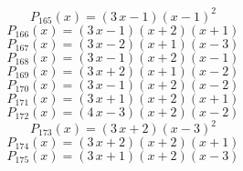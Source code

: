 \subitem \begin{dmath*}P_{165}(x) = {\left(3 \, x - 1\right)} {\left(x - 1\right)}^{2} \end{dmath*}\vspace{-1.2cm}
\subitem \begin{dmath*}P_{166}(x) = {\left(3 \, x - 1\right)} {\left(x + 2\right)} {\left(x + 1\right)} \end{dmath*}\vspace{-1.2cm}
\subitem \begin{dmath*}P_{167}(x) = {\left(3 \, x - 2\right)} {\left(x + 1\right)} {\left(x - 3\right)} \end{dmath*}\vspace{-1.2cm}
\subitem \begin{dmath*}P_{168}(x) = {\left(3 \, x - 1\right)} {\left(x + 2\right)} {\left(x - 1\right)} \end{dmath*}\vspace{-1.2cm}
\subitem \begin{dmath*}P_{169}(x) = {\left(3 \, x + 2\right)} {\left(x + 1\right)} {\left(x - 2\right)} \end{dmath*}\vspace{-1.2cm}
\subitem \begin{dmath*}P_{170}(x) = {\left(3 \, x - 1\right)} {\left(x + 2\right)} {\left(x - 2\right)} \end{dmath*}\vspace{-1.2cm}
\subitem \begin{dmath*}P_{171}(x) = {\left(3 \, x + 1\right)} {\left(x + 2\right)} {\left(x + 1\right)} \end{dmath*}\vspace{-1.2cm}
\subitem \begin{dmath*}P_{172}(x) = {\left(4 \, x - 3\right)} {\left(x + 2\right)} {\left(x - 2\right)} \end{dmath*}\vspace{-1.2cm}
\subitem \begin{dmath*}P_{173}(x) = {\left(3 \, x + 2\right)} {\left(x - 3\right)}^{2} \end{dmath*}\vspace{-1.2cm}
\subitem \begin{dmath*}P_{174}(x) = {\left(3 \, x + 2\right)} {\left(x + 2\right)} {\left(x + 1\right)} \end{dmath*}\vspace{-1.2cm}
\subitem \begin{dmath*}P_{175}(x) = {\left(3 \, x + 1\right)} {\left(x + 2\right)} {\left(x - 3\right)} \end{dmath*}\vspace{-1.2cm}
